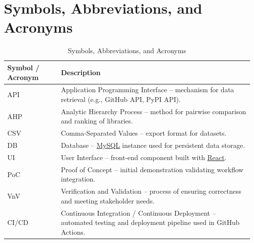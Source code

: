 \documentclass[12pt, titlepage]{article}
\renewcommand{\arraystretch}{1.15}
\begin{document}
\newpage

\tableofcontents



\newpage

\section{Symbols, Abbreviations, and Acronyms}



\begin{table}[H]
\centering
\caption{Symbols, Abbreviations, and Acronyms}
\setlength{\tabcolsep}{5pt}
\renewcommand{\arraystretch}{1.2}
\footnotesize

\begin{tabularx}{\textwidth}{l X}
\toprule
\textbf{Symbol / Acronym} & \textbf{Description} \\
\midrule
\arrayrulecolor[gray]{0.8}
API & Application Programming Interface – mechanism for data retrieval (e.g., GitHub API, PyPI API). \\
\hline
AHP & Analytic Hierarchy Process – method for pairwise comparison and ranking of libraries. \\
\hline
CSV & Comma-Separated Values – export format for datasets. \\
\hline
DB & Database – \href{https://www.mysql.com/}{MySQL} instance used for persistent data storage. \\
\hline
UI & User Interface – front-end component built with \href{https://react.dev/}{React}. \\
\hline
PoC & Proof of Concept – initial demonstration validating workflow integration. \\
\hline
VnV & Verification and Validation – process of ensuring correctness and meeting stakeholder needs. \\
\hline
CI/CD & Continuous Integration / Continuous Deployment – automated testing and deployment pipeline used in GitHub Actions. \\
\bottomrule
\end{tabularx}
\end{table}
\end{document}
